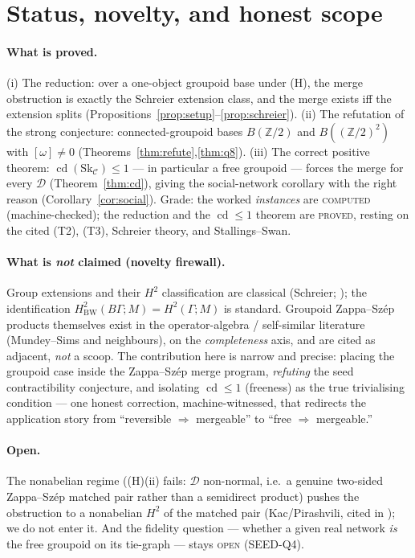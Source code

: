 \documentclass[11pt]{article}
\theoremstyle{definition}
\newcommand{\C}{\mathcal{C}}
\newcommand{\D}{\mathcal{D}}
\newcommand{\Sk}{\mathrm{Sk}}
\newcommand{\Z}{\mathbb{Z}}
\newcommand{\cd}{\operatorname{cd}}
\begin{document}
\section{Status, novelty, and honest scope}\label{sec:status}

\paragraph{What is proved.} (i) The reduction: over a one-object groupoid base
under \textnormal{(H)}, the merge obstruction is exactly the Schreier extension
class, and the merge exists iff the extension splits
(Propositions~\ref{prop:setup}--\ref{prop:schreier}). (ii) The refutation of the
strong conjecture: connected-groupoid bases $B(\Z/2)$ and $B((\Z/2)^2)$ with
$[\omega]\neq0$ (Theorems~\ref{thm:refute},\ref{thm:q8}). (iii) The correct positive
theorem: $\cd(\Sk_\C)\le1$ --- in particular a free groupoid --- forces the merge for
every $\D$ (Theorem~\ref{thm:cd}), giving the social-network corollary with the
right reason (Corollary~\ref{cor:social}). Grade: the worked \emph{instances} are
\textsc{computed} (machine-checked); the reduction and the $\cd\le1$ theorem are
\textsc{proved}, resting on the cited \textnormal{(T2)}, \textnormal{(T3)},
Schreier theory, and Stallings--Swan.

\paragraph{What is \emph{not} claimed (novelty firewall).} Group extensions and
their $H^2$ classification are classical (Schreier; \cite{maclane,brown}); the
identification $H^2_{\mathrm{BW}}(B\Gamma;M)=H^2(\Gamma;M)$ is standard. Groupoid
Zappa--Sz\'ep products themselves exist in the operator-algebra / self-similar
literature (Mundey--Sims and neighbours), on the \emph{completeness} axis, and are
cited as adjacent, \emph{not} a scoop. The contribution here is narrow and precise:
placing the groupoid case inside the Zappa--Sz\'ep merge program, \emph{refuting}
the seed contractibility conjecture, and isolating $\cd\le1$ (freeness) as the true
trivialising condition --- one honest correction, machine-witnessed, that redirects
the application story from ``reversible $\Rightarrow$ mergeable'' to ``free
$\Rightarrow$ mergeable.''

\paragraph{Open.} The nonabelian regime (\textnormal{(H)(ii)} fails: $\D$ non-normal,
i.e.\ a genuine two-sided Zappa--Sz\'ep matched pair rather than a semidirect
product) pushes the obstruction to a nonabelian $H^2$ of the matched pair
(Kac/Pirashvili, cited in \cite{gobstr}); we do not enter it. And the fidelity
question --- whether a given real network \emph{is} the free groupoid on its
tie-graph --- stays \textsc{open} (SEED-Q4).
\end{document}
